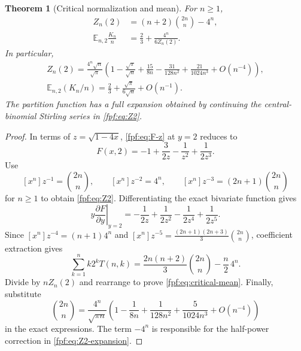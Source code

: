 \documentclass[11pt]{article}
\numberwithin{equation}{section}
\newtheorem{theorem}{Theorem}[section]
\theoremstyle{definition}
\newcommand{\E}{\mathbb E}
\begin{document}
\begin{theorem}[Critical normalization and mean]\label{fpf:thm:critical-exact}
For $n\ge1$,
\begin{align}\label{fpf:eq:Z2}
 Z_n(2)&=(n+2)\binom{2n}{n}-4^n,\\
 \E_{n,2}\frac{K_n}{n}
 &=\frac23+\frac{4^n}{6Z_n(2)}.\label{fpf:eq:critical-mean}
\end{align}
In particular,
\begin{align}\label{fpf:eq:Z2-expansion}
 Z_n(2)=\frac{4^n\sqrt n}{\sqrt\pi}
 \left(1-\frac{\sqrt\pi}{\sqrt n}+\frac{15}{8n}
       -\frac{31}{128n^2}+\frac{21}{1024n^3}+O(n^{-4})\right),\\
 \E_{n,2}(K_n/n)=\frac23+\frac{\sqrt\pi}{6\sqrt n}+O(n^{-1}).
 \label{fpf:eq:mean-expansion}
\end{align}
The partition function has a full expansion obtained by continuing the
central-binomial Stirling series in \eqref{fpf:eq:Z2}.
\end{theorem}
\begin{proof}
In terms of $z=\sqrt{1-4x}$, \eqref{fpf:eq:F-z} at $y=2$ reduces to
\begin{equation}\label{fpf:eq:F2}
 F(x,2)=-1+\frac{3}{2z}-\frac1{z^2}+\frac1{2z^3}.
\end{equation}
Use
\[
 [x^n]z^{-1}=\binom{2n}{n},\qquad
 [x^n]z^{-2}=4^n,\qquad
 [x^n]z^{-3}=(2n+1)\binom{2n}{n}
\]
for $n\ge1$ to obtain \eqref{fpf:eq:Z2}.
Differentiating the exact bivariate function gives
\begin{equation}\label{fpf:eq:F2-firstmoment}
 \left.y\frac{\partial F}{\partial y}\right|_{y=2}
 =-\frac1{2z}+\frac1{2z^2}-\frac1{2z^4}+\frac1{2z^5}.
\end{equation}
Since
$[x^n]z^{-4}=(n+1)4^n$ and
$[x^n]z^{-5}=\frac{(2n+1)(2n+3)}3\binom{2n}{n}$,
coefficient extraction gives
\[
 \sum_{k=1}^n k2^kT(n,k)
 =\frac{2n(n+2)}3\binom{2n}{n}-\frac n2\,4^n.
\]
Divide by $nZ_n(2)$ and rearrange to prove \eqref{fpf:eq:critical-mean}.
Finally, substitute
\[
 \binom{2n}{n}=\frac{4^n}{\sqrt{\pi n}}
 \left(1-\frac1{8n}+\frac1{128n^2}+\frac5{1024n^3}
                     +O(n^{-4})\right)
\]
in the exact expressions. The term $-4^n$ is responsible for the
half-power correction in \eqref{fpf:eq:Z2-expansion}.
\end{proof}
\end{document}
